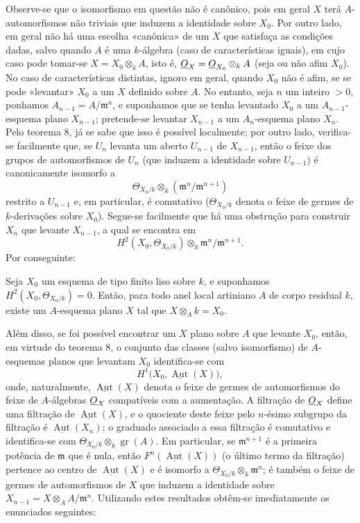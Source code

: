 Observe-se que o isomorfismo em questão não é canônico, pois em geral $X$
terá $A$-automorfismos não triviais que induzem a identidade sobre $X_0$. Por
outro lado, em geral não há uma escolha «canônica» de um $X$ que satisfaça
as condições dadas, salvo quando $A$ é uma $k$-álgebra (caso de
características iguais), em cujo caso pode tomar-se $X=X_0\otimes_k A$, isto
é, $\underline{O}_X=\underline{O}_{X_0}\otimes_k A$ (seja ou não afim $X_0$). No caso de
características distintas, ignoro em geral, quando $X_0$ não é afim, se se
pode «levantar» $X_0$ a um $X$ definido sobre $A$. No entanto, seja $n$ um
inteiro $>0$, ponhamos $A_{n-1}=A/\mathfrak m^n$, e suponhamos que se tenha
levantado $X_0$ a um $A_{n-1}$-esquema plano $X_{n-1}$; pretende-se levantar
$X_{n-1}$ a um $A_n$-esquema plano $X_n$. Pelo teorema 8, já se sabe que isso
é possível localmente; por outro lado, verifica-se facilmente que, se $U_n$
levanta um aberto $U_{n-1}$ de $X_{n-1}$, então o feixe dos grupos de
automorfismos de $U_n$ (que induzem a identidade sobre $U_{n-1}$) é
canonicamente isomorfo a
\[
  \Theta_{X_0/k}\otimes_k(\mathfrak m^n/\mathfrak m^{n+1})
\]
restrito a $U_{n-1}$ e, em particular, é comutativo
($\Theta_{X_0/k}$ denota o feixe de germes de $k$-derivações sobre $X_0$).
Segue-se facilmente que há uma obstrução para construir $X_n$ que levante
$X_{n-1}$, a qual se encontra em
\[
  H^2(X_0,\Theta_{X_0/k})\otimes_k
  \mathfrak m^n/\mathfrak m^{n+1}.
\]
Por conseguinte:

 Seja $X_0$ um esquema de tipo finito liso sobre $k$, e
suponhamos $H^2(X_0,\Theta_{X_0/k})=0$. Então, para todo anel local
artiniano $A$ de corpo residual $k$, existe um $A$-esquema plano $X$ tal que
$X\otimes_A k=X_0$.

Além disso, se foi possível encontrar um $X$ plano sobre $A$ que levante $X_0$,
então, em virtude do teorema 8, o conjunto das classes (salvo isomorfismo)
de $A$-esquemas planos que levantam $X_0$ identifica-se com
\[
  H^1\bigl(X_0,\underline{\operatorname{Aut}}(X)\bigr),
\]
onde, naturalmente, $\underline{\operatorname{Aut}}(X)$ denota o feixe de
germes de automorfismos do feixe de $A$-álgebras $\underline{O}_X$ compatíveis com a
aumentação. A filtração de $\underline{O}_X$ define uma filtração de
$\underline{\operatorname{Aut}}(X)$, e o quociente deste feixe pelo $n$-ésimo
subgrupo da filtração é $\underline{\operatorname{Aut}}(X_n)$; o graduado
associado a essa filtração é comutativo e identifica-se com
$\Theta_{X_0/k}\otimes_k\operatorname{gr}(A)$. Em particular, se
$\mathfrak m^{n+1}$ é a primeira potência de $\mathfrak m$ que é nula,
então $F^n(\underline{\operatorname{Aut}}(X))$ (o último termo da
filtração) pertence ao centro de $\underline{\operatorname{Aut}}(X)$ e é
isomorfo a $\Theta_{X_0/k}\otimes_k\mathfrak m^n$; é também o feixe de
germes de automorfismos de $X$ que induzem a identidade sobre
$X_{n-1}=X\otimes_A A/\mathfrak m^n$. Utilizando estes resultados obtêm-se
imediatamente os enunciados seguintes:

